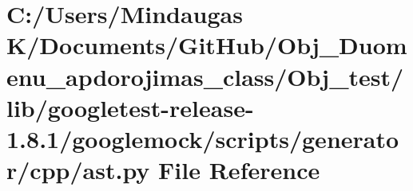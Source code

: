 \hypertarget{_obj__test_2lib_2googletest-release-1_88_81_2googlemock_2scripts_2generator_2cpp_2ast_8py}{}\section{C\+:/\+Users/\+Mindaugas K/\+Documents/\+Git\+Hub/\+Obj\+\_\+\+Duomenu\+\_\+apdorojimas\+\_\+class/\+Obj\+\_\+test/lib/googletest-\/release-\/1.8.1/googlemock/scripts/generator/cpp/ast.py File Reference}
\label{_obj__test_2lib_2googletest-release-1_88_81_2googlemock_2scripts_2generator_2cpp_2ast_8py}
